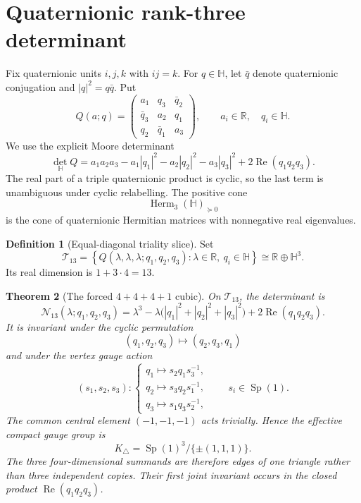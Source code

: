 \documentclass[11pt]{article}
\newtheorem{theorem}{Theorem}[section]
\theoremstyle{definition}
\newtheorem{definition}[theorem]{Definition}
\theoremstyle{remark}
\newcommand{\R}{\mathbb R}
\newcommand{\Hh}{\mathbb H}
\newcommand{\Herm}{\operatorname{Herm}}
\newcommand{\Ree}{\operatorname{Re}}
\newcommand{\Sp}{\operatorname{Sp}}
\newcommand{\cT}{\mathcal T}
\newcommand{\cN}{\mathcal N}
\begin{document}
\tableofcontents

\section{Quaternionic rank-three determinant}

Fix quaternionic units $i,j,k$ with $ij=k$.  For $q\in\Hh$, let $\bar q$ denote quaternionic conjugation and $|q|^2=q\bar q$.  Put
\begin{equation}\label{eq:general-H3H}
 Q(a;q)=
 \begin{pmatrix}
 a_1&q_3&\bar q_2\\
 \bar q_3&a_2&q_1\\
 q_2&\bar q_1&a_3
 \end{pmatrix},
 \qquad a_i\in\R,\quad q_i\in\Hh.
\end{equation}
We use the explicit Moore determinant
\begin{equation}\label{eq:Moore}
 \det_{\Hh}Q
 =a_1a_2a_3-a_1|q_1|^2-a_2|q_2|^2-a_3|q_3|^2
  +2\Ree(q_1q_2q_3).
\end{equation}
The real part of a triple quaternionic product is cyclic, so the last term is unambiguous under cyclic relabelling.  The positive cone
\[
 \Herm_3(\Hh)_{\succeq0}
\]
is the cone of quaternionic Hermitian matrices with nonnegative real eigenvalues.

\begin{definition}[Equal-diagonal triality slice]\label{def:T13}
Set
\begin{equation}\label{eq:T13}
 \cT_{13}
 =\left\{Q(\lambda,\lambda,\lambda;q_1,q_2,q_3):
 \lambda\in\R,\ q_i\in\Hh\right\}
 \cong\R\oplus\Hh^3.
\end{equation}
Its real dimension is $1+3\cdot4=13$.
\end{definition}

\begin{theorem}[The forced $4+4+4+1$ cubic]\label{thm:triality-cubic}
On $\cT_{13}$, the determinant is
\begin{equation}\label{eq:N13}
 \boxed{
 \cN_{13}(\lambda;q_1,q_2,q_3)
 =\lambda^3-\lambda\bigl(|q_1|^2+|q_2|^2+|q_3|^2\bigr)
 +2\Ree(q_1q_2q_3).}
\end{equation}
It is invariant under the cyclic permutation
\[
 (q_1,q_2,q_3)\longmapsto(q_2,q_3,q_1)
\]
and under the vertex gauge action
\begin{equation}\label{eq:vertex-gauge}
 (s_1,s_2,s_3):
 \begin{cases}
 q_1\mapsto s_2q_1s_3^{-1},\\
 q_2\mapsto s_3q_2s_1^{-1},\\
 q_3\mapsto s_1q_3s_2^{-1},
 \end{cases}
 \qquad s_i\in\Sp(1).
\end{equation}
The common central element $(-1,-1,-1)$ acts trivially.  Hence the effective compact gauge group is
\[
 K_\triangle=\Sp(1)^3/\{\pm(1,1,1)\}.
\]
The three four-dimensional summands are therefore edges of one triangle rather than three independent copies.  Their first joint invariant occurs in the closed product $\Ree(q_1q_2q_3)$.
\end{theorem}
\end{document}
